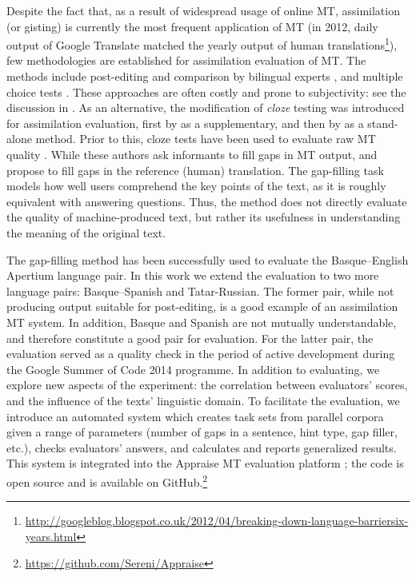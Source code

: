 \documentclass[11pt]{article}
\newcommand{\comment}[1]{}
\begin{document}
Despite the fact that, as a result of widespread usage of online MT, assimilation (or gisting) is currently the most frequent application of MT (in 2012, daily output of Google Translate matched the yearly output of human translations\footnote{\url{http://googleblog.blogspot.co.uk/2012/04/breaking-down-language-barriersix-years.html}}), few methodologies are established for assimilation evaluation of MT. The methods include post-editing and comparison by bilingual experts \citep{ginesti09},\comment{MLF: should we also cite the original WMT reference cited by Ginestí et al.?} and multiple choice tests \citep{jones07,trosterud12}. These approaches are often costly and prone to subjectivity: see the discussion in \cite{oregan13}. As an alternative, the modification of \emph{cloze}\comment{\emph{cloze} stands for \emph{closure}.} testing \citep{taylor53} was introduced for assimilation evaluation, first by \citet{trosterud12} as a supplementary, and then by \citet{oregan13} as a stand-alone method. Prior to this, cloze tests have been used to evaluate raw MT quality \citep{vanslype79,somers00}. While these authors ask informants to fill gaps in MT output, \citet{trosterud12} and \citet{oregan13} propose to fill gaps in the reference (human) translation. The gap-filling task models how well users comprehend the key points of the text, as it is roughly equivalent with answering questions. Thus, the method does not directly evaluate the quality of machine-produced text, but rather its usefulness in understanding the meaning of the original text. 

The gap-filling method has been successfully used to evaluate the Basque--English Apertium language pair. In this work we extend the evaluation to two more language pairs: Basque--Spanish and Tatar-Russian. The former pair, while not producing output suitable for post-editing, is a good example of an assimilation MT system. In addition, Basque and Spanish are not mutually understandable, and therefore constitute a good pair for evaluation. For the latter pair, the evaluation served as a quality check in the period of active development during the Google Summer of Code 2014 programme. In addition to evaluating, we explore new aspects of the experiment: the correlation between evaluators' scores, and the influence of the texts' linguistic domain. To facilitate the evaluation, we introduce an automated system which creates task sets from parallel corpora given a range of parameters (number of gaps in a sentence, hint type, gap filler,\comment{MLF: gap filler or gap marker?} \comment{EA: well, initially we had questions with lemmas in place of gaps, and also multiple choice questions where answer options got generated automatically. This is not used in this evaluation, but it's still in the toolkit. Should I remove?} etc.), checks evaluators' answers, and calculates and reports generalized results. This system is integrated into the Appraise MT evaluation platform \citep{federmann12}; the code is open source and is available on GitHub.\footnote{{\url{https://github.com/Sereni/Appraise}}}
\end{document}
